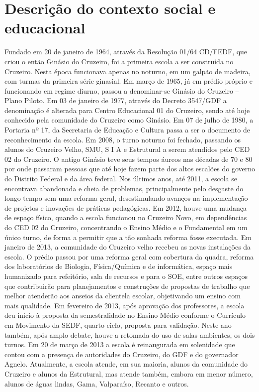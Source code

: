 \chapter{Descrição do contexto social e educacional}

Fundado em 20 de janeiro de 1964, através da Resolução 01/64 CD/FEDF, que criou o então Ginásio do Cruzeiro, foi a primeira escola a ser construída no Cruzeiro. Nesta época funcionava apenas no noturno, em um galpão de madeira, com turmas da primeira série ginasial. Em março de 1965, já em prédio próprio e funcionando em regime diurno, passou a denominar-se Ginásio do Cruzeiro – Plano Piloto. Em 03 de janeiro de 1977, através do Decreto 3547/GDF a denominação é alterada para Centro Educacional 01 do Cruzeiro, sendo até hoje conhecido pela comunidade do Cruzeiro como Ginásio. Em 07 de julho de 1980, a Portaria nº 17, da Secretaria de Educação e Cultura passa a ser o documento de reconhecimento da escola.
Em 2008, o turno noturno foi fechado, passando os alunos do Cruzeiro Velho, SMU, S I A e Estrutural a serem atendidos pelo CED 02 do Cruzeiro.
O antigo Ginásio teve seus tempos áureos nas décadas de 70 e 80 por onde passaram pessoas que até hoje fazem parte dos altos escalões do governo do Distrito Federal e da área federal.
Nos últimos anos, até 2011, a escola se encontrava abandonada e cheia de problemas, principalmente pelo desgaste do longo tempo sem uma reforma geral, desestimulando avanços na implementação de projetos e inovações de práticas pedagógicas.
Em 2012, houve uma mudança de espaço físico, quando a escola funcionou no Cruzeiro Novo, em dependências do CED 02 do Cruzeiro, concentrando o Ensino Médio e o Fundamental em um único turno, de forma a permitir que a tão sonhada reforma fosse executada.
Em janeiro de 2013, a comunidade do Cruzeiro velho recebeu as novas instalações da escola. O prédio passou por uma reforma geral com cobertura da quadra, reforma dos laboratórios de Biologia, Física/Química e de informática, espaço mais humanizado para refeitório, sala de recursos e para o SOE, entre outros espaços que contribuirão para planejamentos e construções de propostas de trabalho que melhor atenderão aos anseios da clientela escolar, objetivando um ensino com mais qualidade.
Em fevereiro de 2013, após aprovação dos professores, a escola deu inicio à proposta da semestralidade no Ensino Médio conforme o Currículo em Movimento da SEDF, quarto ciclo, proposta para validação. Neste ano também, após amplo debate, houve a retomada do uso de salas ambientes, os dois turnos.
Em 20 de março de 2013 a escola é reinaugurada em solenidade que contou com a presença de autoridades do Cruzeiro, do GDF e do governador Agnelo.
Atualmente, a escola atende, em sua maioria, alunos da comunidade do Cruzeiro e alunos da Estrutural, mas atende também, embora em menor número, alunos de águas lindas, Gama, Valparaíso, Recanto e outros.

\newpage